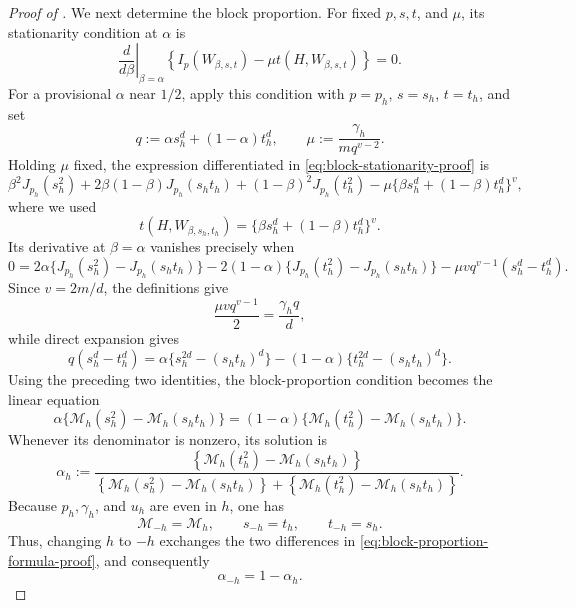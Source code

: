\begin{proof}[Proof of ]
We next determine the block proportion.  For fixed $p,s,t$, and $\mu$, its
stationarity condition at $\alpha$ is
\begin{equation}\label{eq:block-stationarity-proof}
  \left.\frac{d}{d\beta}\right|_{\beta=\alpha}
  \left\{I_p(W_{\beta,s,t})-\mu t(H,W_{\beta,s,t})\right\}=0.
\end{equation}
For a provisional $\alpha$ near $1/2$, apply this condition with
$p=p_h$, $s=s_h$, $t=t_h$, and set
\[
  q:=\alpha s_h^d+(1-\alpha)t_h^d,
  \qquad
  \mu:=\frac{\gamma_h}{m q^{v-2}}.
\]
Holding $\mu$ fixed, the expression differentiated in
\eqref{eq:block-stationarity-proof} is
\[
  \beta^2J_{p_h}(s_h^2)
  +2\beta(1-\beta)J_{p_h}(s_ht_h)
  +(1-\beta)^2J_{p_h}(t_h^2)
  -\mu\{\beta s_h^d+(1-\beta)t_h^d\}^v,
\]
where we used
\[
  t(H,W_{\beta,s_h,t_h})
  =\{\beta s_h^d+(1-\beta)t_h^d\}^v.
\]
Its derivative at $\beta=\alpha$ vanishes precisely when
\[
  0=2\alpha\{J_{p_h}(s_h^2)-J_{p_h}(s_ht_h)\}
  -2(1-\alpha)\{J_{p_h}(t_h^2)-J_{p_h}(s_ht_h)\}
  -\mu v q^{v-1}(s_h^d-t_h^d).
\]
Since $v=2m/d$, the definitions give
\[
  \frac{\mu v q^{v-1}}2
  =\frac{\gamma_h q}{d},
\]
while direct expansion gives
\begin{equation}\label{eq:block-moment-identity}
  q(s_h^d-t_h^d)
  =\alpha\{s_h^{2d}-(s_ht_h)^d\}
   -(1-\alpha)\{t_h^{2d}-(s_ht_h)^d\}.
\end{equation}
Using the preceding two identities, the block-proportion condition becomes
the linear equation
\begin{equation}\label{eq:block-proportion-balance}
  \alpha\{\mathcal M_h(s_h^2)-\mathcal M_h(s_ht_h)\}
  =(1-\alpha)\{\mathcal M_h(t_h^2)-\mathcal M_h(s_ht_h)\}.
\end{equation}
Whenever its denominator is nonzero, its solution is
\begin{equation}\label{eq:block-proportion-formula-proof}
  \alpha_h
  :=\frac{\left\{\mathcal M_h(t_h^2)-\mathcal M_h(s_ht_h)\right\}}
  {\left\{\mathcal M_h(s_h^2)-\mathcal M_h(s_ht_h)\right\}
   +\left\{\mathcal M_h(t_h^2)-\mathcal M_h(s_ht_h)\right\}}.
\end{equation}
Because $p_h,\gamma_h$, and $u_h$ are even in $h$, one has
\[
  \mathcal M_{-h}=\mathcal M_h,
  \qquad
  s_{-h}=t_h,
  \qquad
  t_{-h}=s_h.
\]
Thus, changing $h$ to $-h$ exchanges the two differences in
\eqref{eq:block-proportion-formula-proof}, and consequently
\[
  \alpha_{-h}=1-\alpha_h.
\]


\end{proof}

